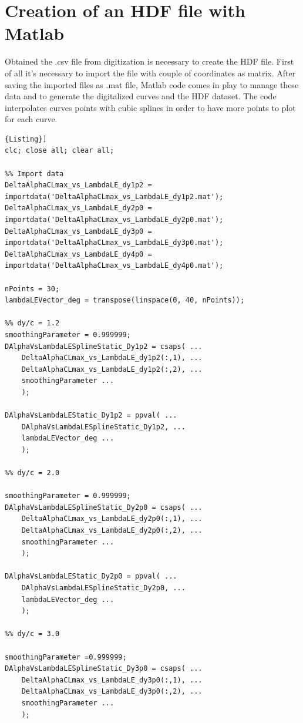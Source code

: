 \section{Creation of an HDF file with Matlab}

Obtained the .csv file from digitization is necessary to create the HDF file. First of all it's necessary to import the file with couple of coordinates as matrix. After saving the imported files as .mat file, Matlab code comes in play to manage these data and to generate the digitalized curves and the HDF dataset.  The code interpolates curves points with cubic splines in order to have more points to plot for each curve.

\bigskip
\lstset{language=Matlab}
\begin{lstlisting}[frame=rbl,caption={{\footnotesize MATLAB script for creating the HDF Database}},label= [style=\bfseries]{Listing}]
clc; close all; clear all;

%% Import data
DeltaAlphaCLmax_vs_LambdaLE_dy1p2 = importdata('DeltaAlphaCLmax_vs_LambdaLE_dy1p2.mat');
DeltaAlphaCLmax_vs_LambdaLE_dy2p0 = importdata('DeltaAlphaCLmax_vs_LambdaLE_dy2p0.mat');
DeltaAlphaCLmax_vs_LambdaLE_dy3p0 = importdata('DeltaAlphaCLmax_vs_LambdaLE_dy3p0.mat');
DeltaAlphaCLmax_vs_LambdaLE_dy4p0 = importdata('DeltaAlphaCLmax_vs_LambdaLE_dy4p0.mat');

nPoints = 30;
lambdaLEVector_deg = transpose(linspace(0, 40, nPoints));

%% dy/c = 1.2
smoothingParameter = 0.999999;
DAlphaVsLambdaLESplineStatic_Dy1p2 = csaps( ...
    DeltaAlphaCLmax_vs_LambdaLE_dy1p2(:,1), ...
    DeltaAlphaCLmax_vs_LambdaLE_dy1p2(:,2), ...
    smoothingParameter ...
    );

DAlphaVsLambdaLEStatic_Dy1p2 = ppval( ...
    DAlphaVsLambdaLESplineStatic_Dy1p2, ...
    lambdaLEVector_deg ...
    );

%% dy/c = 2.0

smoothingParameter = 0.999999; 
DAlphaVsLambdaLESplineStatic_Dy2p0 = csaps( ...
    DeltaAlphaCLmax_vs_LambdaLE_dy2p0(:,1), ...
    DeltaAlphaCLmax_vs_LambdaLE_dy2p0(:,2), ...
    smoothingParameter ...
    );

DAlphaVsLambdaLEStatic_Dy2p0 = ppval( ...
    DAlphaVsLambdaLESplineStatic_Dy2p0, ...
    lambdaLEVector_deg ...
    );

%% dy/c = 3.0

smoothingParameter =0.999999;
DAlphaVsLambdaLESplineStatic_Dy3p0 = csaps( ...
    DeltaAlphaCLmax_vs_LambdaLE_dy3p0(:,1), ...
    DeltaAlphaCLmax_vs_LambdaLE_dy3p0(:,2), ...
    smoothingParameter ...
    );


\end{lstlisting}
